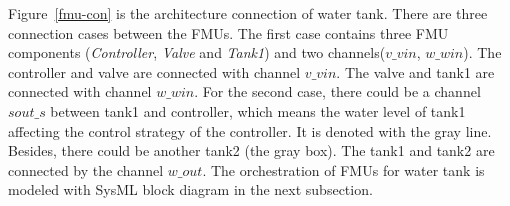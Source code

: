\begin{figure}[htbp]
\end{figure}
Figure~\ref{fmu-con} is the architecture connection of water tank. There are three connection cases between the FMUs. The first case contains three FMU components (\emph{Controller}, \emph{Valve} and \emph{ Tank1}) and two channels($v \_ vin$, $w \_ win$). The controller and valve are connected with channel $v \_ vin$. The valve and tank1 are connected with channel $w \_ win$. For the second case, there could be a channel $sout \_ s$ between tank1 and controller, which means the water level of tank1 affecting the control strategy of the controller. It is denoted with the gray line. Besides, there could be another tank2 (the gray box). The tank1 and tank2 are connected by the channel $w \_ out$. The orchestration of FMUs for water tank is modeled with SysML block diagram in the next subsection.